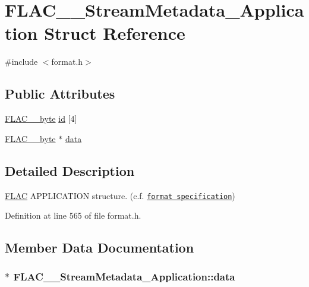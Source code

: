 \hypertarget{struct_f_l_a_c_____stream_metadata___application}{}\section{F\+L\+A\+C\+\_\+\+\_\+\+Stream\+Metadata\+\_\+\+Application Struct Reference}
\label{struct_f_l_a_c_____stream_metadata___application}


{\ttfamily \#include $<$format.\+h$>$}

\subsection*{Public Attributes}
\begin{DoxyCompactItemize}
\item 
\hyperlink{ordinals_8h_a5eb569b12d5b047cdacada4d57924ee3}{F\+L\+A\+C\+\_\+\+\_\+byte} \hyperlink{struct_f_l_a_c_____stream_metadata___application_a0af01573d097b37b48b4a414318ec2ec}{id} \mbox{[}4\mbox{]}
\item 
\hyperlink{ordinals_8h_a5eb569b12d5b047cdacada4d57924ee3}{F\+L\+A\+C\+\_\+\+\_\+byte} $\ast$ \hyperlink{struct_f_l_a_c_____stream_metadata___application_a97a241798553043467ac1c94d7fe1319}{data}
\end{DoxyCompactItemize}


\subsection{Detailed Description}
\hyperlink{namespace_f_l_a_c}{F\+L\+AC} A\+P\+P\+L\+I\+C\+A\+T\+I\+ON structure. (c.\+f. \href{../format.html#metadata_block_application}{\tt format specification}) 

Definition at line 565 of file format.\+h.



\subsection{Member Data Documentation}
\subsubsection[{\texorpdfstring{data}{data}}]{$\ast$ F\+L\+A\+C\+\_\+\+\_\+\+Stream\+Metadata\+\_\+\+Application\+::data}\hypertarget{struct_f_l_a_c_____stream_metadata___application_a97a241798553043467ac1c94d7fe1319}{}\label{struct_f_l_a_c_____stream_metadata___application_a97a241798553043467ac1c94d7fe1319}


